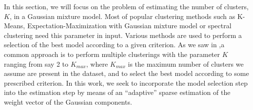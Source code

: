 In this section, we will focus on the problem of estimating the number of clusters, $K$, in a Gaussian mixture model. Most of popular clustering methods such as K-Means, Expectation-Maximization with Gaussian mixture model or spectral clustering need this parameter in input. Various methods are used to perform a selection of the best model according to a given criterion. As we saw in ,a common approach is to perform multiple clusterings with the parameter $K$ ranging from say 2 to $K_{max}$, where $K_{max}$ is the maximum number of clusters we assume are present in the dataset, and to select the best model according to some prescribed criterion. In this work, we seek to incorporate the model selection step into the estimation step by means of an ``adaptive'' sparse estimation of the weight vector of the Gaussian components.

